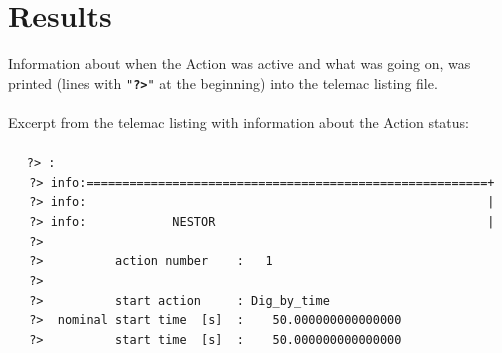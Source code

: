 \newpage
\section{Results} \label{sec:E1Result}
%
Information about when the Action was active and what was going on,
was printed (lines with \texttt{"\textbf{?>}"} at the beginning) into the telemac listing file.\\
\\
\label{txt:E1List}
Excerpt from the telemac listing with information about the Action status:\\
\\~\hspace*{3mm} \texttt{\small{~?>~:}}
\\~\hspace*{3mm}~\texttt{\small{~?>~info:========================================================+}}
\\~\hspace*{3mm}~\texttt{\small{~?>~info:~~~~~~~~~~~~~~~~~~~~~~~~~~~~~~~~~~~~~~~~~~~~~~~~~~~~~~~~|}}
\\~\hspace*{3mm}~\texttt{\small{~?>~info:~~~~~~~~~~~~NESTOR~~~~~~~~~~~~~~~~~~~~~~~~~~~~~~~~~~~~~~|}}
\\~\hspace*{3mm}~\texttt{\small{~?>~~~~~~~~~~~~~~~~~~~~~~~~~~~~~~~~~~~~~~~~~~~~~~~~~~~~~~~~~~~~~~~}}
\\~\hspace*{3mm}~\texttt{\small{~?>~~~~~~~~~~action~number~~~~:~~~1~~~~~~~~~~~~~~~~~~~~~~~~~~~~~~~}}
\\~\hspace*{3mm}~\texttt{\small{~?>~~~~~~~~~~~~~~~~~~~~~~~~~~~~~~~~~~~~~~~~~~~~~~~~~~~~~~~~~~~~~~~}}
\\~\hspace*{3mm}~\texttt{\small{~?>~~~~~~~~~~start~action~~~~~:~Dig\_by\_time~~~~~~~~~~~~~~~~~~~~~~~}}
\\~\hspace*{3mm}~\texttt{\small{~?>~~nominal~start~time~~[s]~~:~~~~50.000000000000000~~~~~~~~~~~~~}}
\\~\hspace*{3mm}~\texttt{\small{~?>~~~~~~~~~~start~time~~[s]~~:~~~~50.000000000000000~~~~~~~~~~~~~}}
